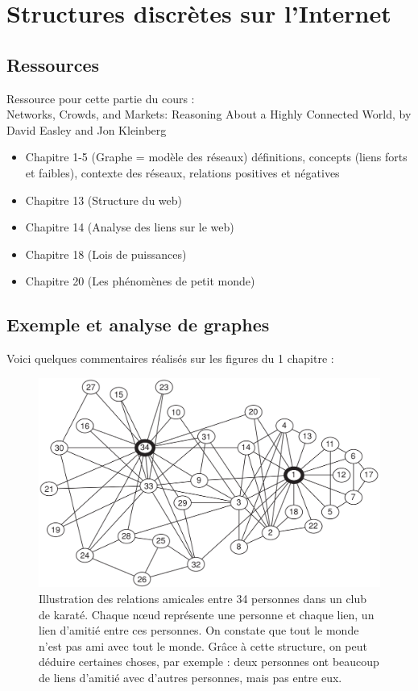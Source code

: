 \chapter{Structures discrètes sur l'Internet}

\section{Ressources}
Ressource pour cette partie du cours :\\
Networks, Crowds, and Markets: Reasoning About a Highly Connected World, by David Easley and Jon Kleinberg

\begin{itemize}
\item Chapitre 1-5 (Graphe = modèle des réseaux) définitions, concepts (liens forts et faibles), contexte des réseaux, relations positives et négatives
\item Chapitre 13 (Structure du web)
\item Chapitre 14 (Analyse des liens sur le web)
\item Chapitre 18 (Lois de puissances)
\item Chapitre 20 (Les phénomènes de petit monde)
\end{itemize}

\section{Exemple et analyse de graphes}
Voici quelques commentaires réalisés sur les figures du 1 chapitre :

\begin{center}
\begin{figure}[!ht]
\includegraphics[width=0.75\linewidth]{images/17_karate_club.png}
\caption{Illustration des relations amicales entre 34 personnes dans un
    club de karaté. Chaque n\oe ud représente une personne et chaque lien,
    un lien d'amitié entre ces personnes. On constate que tout le monde
n'est pas ami avec tout le monde. Grâce à cette structure, on peut
déduire certaines choses, par exemple : deux personnes ont beaucoup de
liens d'amitié avec d'autres personnes, mais pas entre eux.}
\end{figure}
\end{center}


